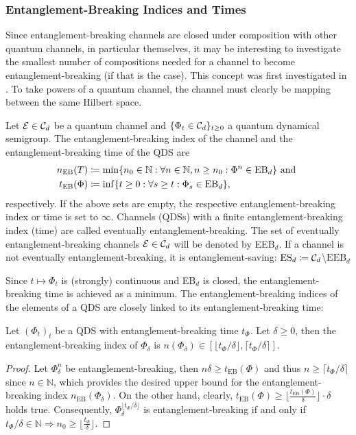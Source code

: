\subsubsection{Entanglement-Breaking Indices and Times}
Since entanglement-breaking channels are closed under composition with other quantum channels, in particular themselves, it may be interesting to investigate the smallest number of compositions needed for a channel to become entanglement-breaking (if that is the case). This concept was first investigated in \cite{lamiEntanglementBreakingIndices2015}. To take powers of a quantum channel, the channel must clearly be mapping between the same Hilbert space.
\begin{definition}
    Let $\mathcal E \in \mathcal C_d$ be a quantum channel and $\{\Phi_t \in \mathcal C_d\}_{t\geq 0}$ a quantum dynamical semigroup. The entanglement-breaking index of the channel and the entanglement-breaking time of the QDS are 
    \begin{align*}
        n_\text{EB}(T) &\coloneqq \min\{n_0 \in \mathbb{N}: \forall n \in \mathbb{N}, n\geq n_0 :\Phi^n \in \text{EB}_d\} \text{ and }\\
        t_\text{EB}(\Phi)&\coloneqq \inf\{t\geq 0: \forall s \geq t : \Phi_s \in \text{EB}_d \},
    \end{align*}
    respectively. If the above sets are empty, the respective entanglement-breaking index or time is set to $\infty$. Channels (QDSs) with a finite entanglement-breaking index (time) are called eventually entanglement-breaking. The set of eventually entanglement-breaking channels $\mathcal E\in \mathcal C_d$ will be denoted by EEB$_d$. If a channel is not eventually entanglement-breaking, it is entanglement-saving: $\text{ES}_d\coloneqq \mathcal C_d $\textbackslash $\text{EEB}_d$
    \end{definition}\noindent
Since $t\mapsto \Phi_t$ is (strongly) continuous and EB$_d$ is closed, the entanglement-breaking time is achieved as a minimum. The entanglement-breaking indices of the elements of a QDS are closely linked to its entanglement-breaking time:
\begin{prop}
Let $(\Phi_t)_t$ be a QDS with entanglement-breaking time $t_\Phi$. Let $\delta \geq 0$, then the entanglement-breaking index of 
$\Phi_\delta$ is $n(\Phi_\delta) \in [\lfloor t_\Phi / \delta \rfloor, \lceil t_\Phi / \delta \rceil]$.
\end{prop}
\begin{proof}

Let $\Phi_\delta^n$ be entanglement-breaking, then $n\delta \geq t_\text{EB}(\Phi)$ and thus $ n \geq \lceil {t_\Phi}/{\delta} \rceil$ since $n \in \mathbb{N}$, which provides the desired upper bound for the entanglement-breaking index $n_\text{EB}(\Phi_\delta)$. On the other hand, clearly, 
$t_\text{EB}(\Phi) \geq \lfloor \frac{t_\text{EB}(\Phi)}{\delta} \rfloor \cdot \delta$ holds true.  Consequently, $\Phi_\delta^{\lfloor t_\Phi / \delta \rfloor}$ is entanglement-breaking if and only if ${t_\Phi}/{\delta} \in \mathbb{N} \Rightarrow n_0 \geq \lfloor \frac{t_\Phi}{\delta} \rfloor$.
\end{proof}\noindent

